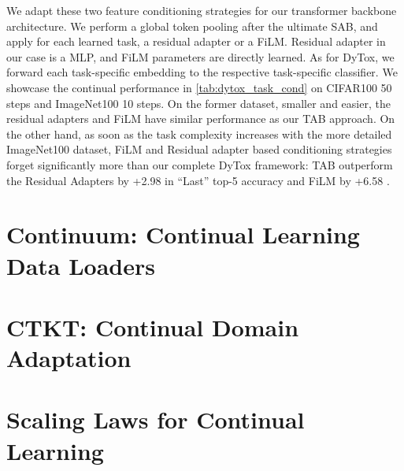 We adapt these two feature conditioning strategies for our transformer backbone architecture. We
perform a global token pooling after the ultimate SAB, and apply for each learned task, a residual
adapter or a FiLM. Residual adapter in our case is a MLP, and FiLM parameters are directly learned.
As for DyTox, we forward each task-specific embedding to the respective task-specific classifier. We
showcase the continual performance in \autoref{tab:dytox_task_cond} on CIFAR100 50 steps and ImageNet100
10 steps. On the former dataset, smaller and easier,  the residual adapters and FiLM have similar
performance as our TAB approach. On the other hand, as soon as the task complexity increases with
the more detailed ImageNet100 dataset, FiLM and Residual adapter based conditioning strategies
forget significantly more than our complete DyTox framework: TAB outperform the Residual Adapters by
+2.98 \pp in ``Last'' top-5 accuracy and FiLM by +6.58 \pp.





\section{Continuum: Continual Learning Data Loaders}

\section{CTKT: Continual Domain Adaptation}

\section{Scaling Laws for Continual Learning}


